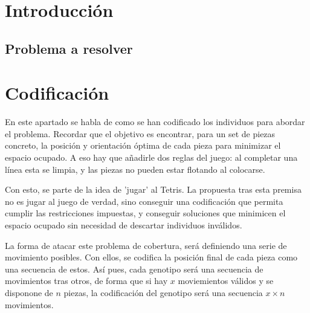 \documentclass[11pt,spanish,listoffigures,listoftables]{tfgetsinf}
\begin{document}


\chapter{Introducción}

\section{Problema a resolver}

\mainmatter
\chapter{Codificación}
En este apartado se habla de como se han codificado los individuos para abordar el problema. Recordar que el objetivo es encontrar, para un set de piezas concreto, la posición y orientación óptima de cada pieza para minimizar el espacio ocupado. A eso hay que añadirle dos reglas del juego: al completar una línea esta se limpia, y las piezas no pueden estar flotando al colocarse.

Con esto, se parte de la idea de 'jugar' al Tetris. La propuesta tras esta premisa no es jugar al juego de verdad, sino conseguir una codificación que permita cumplir las restricciones impuestas, y conseguir soluciones que minimicen el espacio ocupado sin necesidad de descartar individuos inválidos. 

La forma de atacar este problema de cobertura, será definiendo una serie de movimiento posibles. Con ellos, se codifica la posición final de cada pieza como una secuencia de estos. Así pues, cada genotipo será una secuencia de movimientos tras otros, de forma que si hay $x$ moviemientos válidos y se disponone de $n$ piezas, la codificación del genotipo será una secuencia $x \times n$ movimientos.
\end{document}
